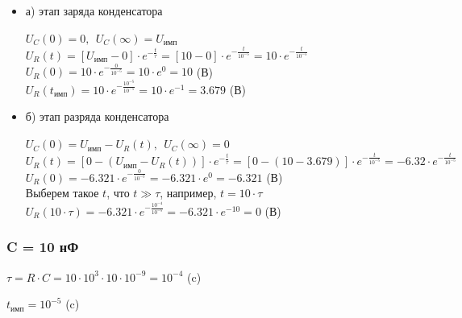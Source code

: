 \begin{itemize}
\item[] а) этап заряда конденсатора

		$U_C(0)	= 0,\ \ U_C(\infty) = U_\text{имп}$\\
		$U_R(t) = [U_\text{имп} - 0] \cdot e^{-\frac{t}{\tau}} = [10 - 0] \cdot e^{-\frac{t}{10^{-5}}} = 10 \cdot e^{-\frac{t}{10^{-5}}}$\\
		$U_R(0) = 10 \cdot e^{-\frac{0}{10^{-5}}} = 10 \cdot e^0 = 10$ (В)\\
		$U_R(t_\text{имп}) = 10 \cdot e^{-\frac{10^{-5}}{10^{-5}}} = 10 \cdot e^{-1} = 3.679$ (В)\\

\item[] б) этап разряда конденсатора

		$U_C(0)	= U_\text{имп} - U_R(t),\ \ U_C(\infty) = 0$\\
		$U_R(t) = [0 - (U_\text{имп} - U_R(t))] \cdot e^{-\frac{t}{\tau}} = [0 - (10 - 3.679)] \cdot e^{-\frac{t}{10^{-5}}} = -6.32 \cdot e^{-\frac{t}{10^{-5}}}$\\
		$U_R(0) = -6.321 \cdot e^{-\frac{0}{10^{-5}}} = -6.321 \cdot e^0 = -6.321$ (В)\\
		Выберем такое $t$, что $t \gg \tau$, например, $t = 10 \cdot \tau$ \\
		$U_R(10 \cdot \tau)	= -6.321 \cdot e^{-\frac{10^{-4}}{10^{-5}}} = -6.321 \cdot e^{-10} = 0$ (В)\\
		
\end{itemize}

\subsubsection{C = 10 нФ}

		$\tau = R \cdot C = 10 \cdot 10^3 \cdot 10 \cdot 10^{-9} = 10^{-4}$ (c)
		
		$t_\text{имп} = 10^{-5}$ (c)

